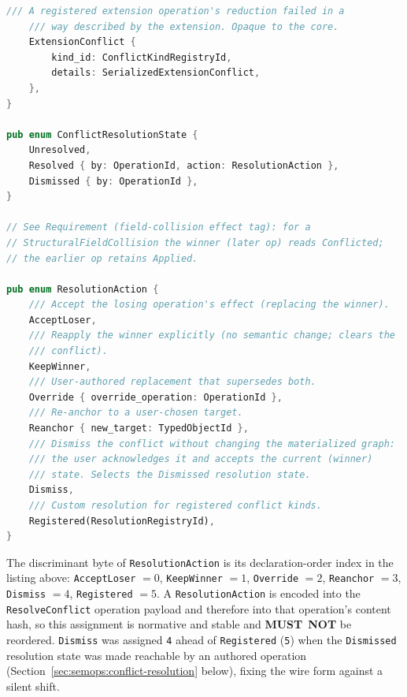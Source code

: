 \documentclass[11pt,letterpaper]{report}
\newcounter{requirement}[chapter]
\newcommand{\MUSTNOT}{\textbf{MUST}\nobreak\ \textbf{NOT}}
\begin{document}
\begin{lstlisting}[language=Rust]
    /// A registered extension operation's reduction failed in a
    /// way described by the extension. Opaque to the core.
    ExtensionConflict {
        kind_id: ConflictKindRegistryId,
        details: SerializedExtensionConflict,
    },
}

pub enum ConflictResolutionState {
    Unresolved,
    Resolved { by: OperationId, action: ResolutionAction },
    Dismissed { by: OperationId },
}

// See Requirement (field-collision effect tag): for a
// StructuralFieldCollision the winner (later op) reads Conflicted;
// the earlier op retains Applied.

pub enum ResolutionAction {
    /// Accept the losing operation's effect (replacing the winner).
    AcceptLoser,
    /// Reapply the winner explicitly (no semantic change; clears the
    /// conflict).
    KeepWinner,
    /// User-authored replacement that supersedes both.
    Override { override_operation: OperationId },
    /// Re-anchor to a user-chosen target.
    Reanchor { new_target: TypedObjectId },
    /// Dismiss the conflict without changing the materialized graph:
    /// the user acknowledges it and accepts the current (winner)
    /// state. Selects the Dismissed resolution state.
    Dismiss,
    /// Custom resolution for registered conflict kinds.
    Registered(ResolutionRegistryId),
}
\end{lstlisting}

\begin{requirement}
  \label{req:semops:resolution-action-discriminants}
  The discriminant byte of \texttt{ResolutionAction} is its
  declaration-order index in the listing above: \texttt{AcceptLoser}
  $= 0$, \texttt{KeepWinner} $= 1$, \texttt{Override} $= 2$,
  \texttt{Reanchor} $= 3$, \texttt{Dismiss} $= 4$, \texttt{Registered}
  $= 5$. A \texttt{ResolutionAction} is encoded into the
  \texttt{ResolveConflict} operation payload and therefore into that
  operation's content hash, so this assignment is normative and stable
  and \MUSTNOT{} be reordered. \texttt{Dismiss} was assigned \texttt{4}
  ahead of \texttt{Registered} (\texttt{5}) when the \texttt{Dismissed}
  resolution state was made reachable by an authored operation
  (Section~\ref{sec:semops:conflict-resolution} below), fixing the wire
  form against a silent shift.
\end{requirement}
\end{document}
